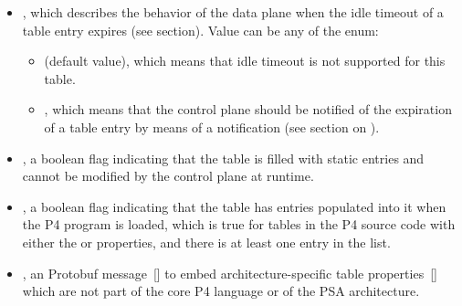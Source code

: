 \documentclass[11pt]{article}
\begin{document}
{\begin{itemize}
\item{}
, which describes the behavior of the data plane when
the idle timeout of a table entry expires (see
 section). Value can be any of the
 enum:%

\begin{itemize}[noitemsep,topsep=\mdcompacttopsep]%

\item{} (default value), which means that idle timeout is not
supported for this table.%

\item{}, which means that the control plane should be notified of
the expiration of a table entry by means of a notification (see section on
).%
\end{itemize}%

\item{}
, a boolean flag indicating that the table is filled with
static entries and cannot be modified by the control plane at runtime.%

\item{}
, a boolean flag indicating that the table has
entries populated into it when the P4 program is loaded, which is
true for tables in the P4 source code with either the  or
 properties, and there is at least one entry in the
list.%

\item{}
, an  Protobuf message~[] to embed
architecture-specific table properties~[] which are not part
of the core P4 language or of the PSA architecture.%
\end{itemize}%

}
\end{document}
